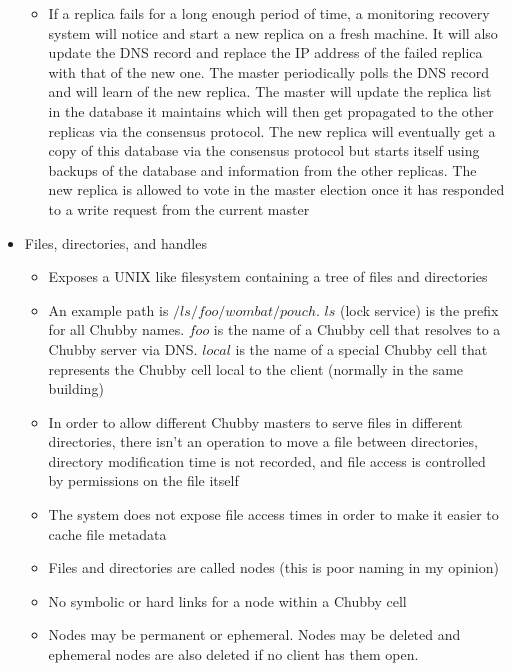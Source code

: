 \documentclass[a4paper]{article}
\begin{document}
\begin{itemize}
\begin{itemize}
\item If a replica fails for a long enough period of time, a monitoring recovery system will notice and start a new replica on a fresh machine. It will also update the DNS record and replace the IP address of the failed replica with that of the new one. The master periodically polls the DNS record and will learn of the new replica. The master will update the replica list in the database it maintains which will then get propagated to the other replicas via the consensus protocol. The new replica will eventually get a copy of this database via the consensus protocol but starts itself using backups of the database and information from the other replicas. The new replica is allowed to vote in the master election once it has responded to a write request from the current master
\end{itemize}

\item Files, directories, and handles
\begin{itemize}
\item Exposes a UNIX like filesystem containing a tree of files and directories

\item An example path is $/ls/foo/wombat/pouch$. $ls$ (lock service) is the prefix for all Chubby names. $foo$ is the name of a Chubby cell that resolves to a Chubby server via DNS. $local$ is the name of a special Chubby cell that represents the Chubby cell local to the client (normally in the same building)

\item In order to allow different Chubby masters to serve files in different directories, there isn't an operation to move a file between directories, directory modification time is not recorded, and file access is controlled by permissions on the file itself

\item The system does not expose file access times in order to make it easier to cache file metadata

\item Files and directories are called nodes (this is poor naming in my opinion)

\item No symbolic or hard links for a node within a Chubby cell

\item Nodes may be permanent or ephemeral. Nodes may be deleted and ephemeral nodes are also deleted if no client has them open. 


\end{itemize}
\end{itemize}
\end{document}
